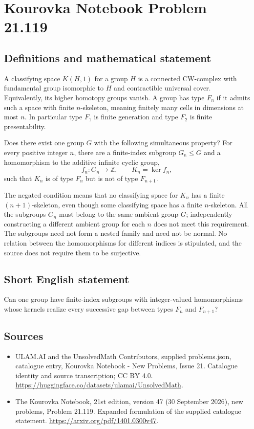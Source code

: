 \documentclass[11pt,a4paper]{article}
\begin{document}
\section*{Kourovka Notebook Problem 21.119}\label{statement}

\subsection{Definitions and mathematical statement}
A classifying space $K(H,1)$ for a group $H$ is a connected CW-complex with fundamental group isomorphic to $H$ and contractible universal cover. Equivalently, its higher homotopy groups vanish. A group has type $F_n$ if it admits such a space with finite $n$-skeleton, meaning finitely many cells in dimensions at most $n$. In particular type $F_1$ is finite generation and type $F_2$ is finite presentability.

Does there exist one group $G$ with the following simultaneous property? For every positive integer $n$, there are a finite-index subgroup $G_n\le G$ and a homomorphism to the additive infinite cyclic group,
\[
 f_n:G_n\longrightarrow\mathbb Z,
 \qquad K_n=\ker f_n,
\]
such that $K_n$ is of type $F_n$ but is not of type $F_{n+1}$.

The negated condition means that no classifying space for $K_n$ has a finite $(n+1)$-skeleton, even though some classifying space has a finite $n$-skeleton. All the subgroups $G_n$ must belong to the same ambient group $G$; independently constructing a different ambient group for each $n$ does not meet this requirement. The subgroups need not form a nested family and need not be normal. No relation between the homomorphisms for different indices is stipulated, and the source does not require them to be surjective.
\subsection{Short English statement}
Can one group have finite-index subgroups with integer-valued homomorphisms whose kernels realize every successive gap between types $F_n$ and $F_{n+1}$?
\subsection{Sources}
\begin{itemize}
\item[S1] ULAM.AI and the UnsolvedMath Contributors, supplied problems.json, catalogue entry, Kourovka Notebook - New Problems, Issue 21. Catalogue identity and source transcription; CC BY 4.0.
\url{https://huggingface.co/datasets/ulamai/UnsolvedMath}.
\item[S2] The Kourovka Notebook, 21st edition, version 47 (30 September 2026), new problems, Problem 21.119. Expanded formulation of the supplied catalogue statement.
\url{https://arxiv.org/pdf/1401.0300v47}.
\end{itemize}
\end{document}
